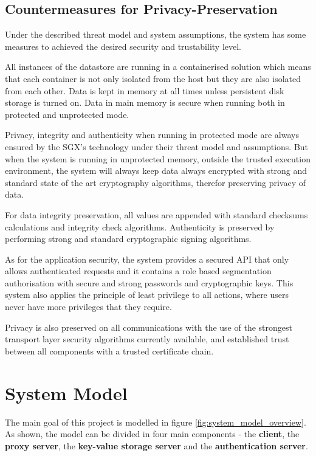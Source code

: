 \subsection{Countermeasures for Privacy-Preservation}
\label{ssec:contermeaseures_for_privacy_preservation}

Under the described threat model and system assumptions, the system has some measures to achieved the desired security and trustability level.

All instances of the datastore are running in a containerised solution which means that each container is not only isolated from the host but they are also isolated from each other. Data is kept in memory at all times unless persistent disk storage is turned on. Data in main memory is secure when running both in protected and unprotected mode. 

Privacy, integrity and authenticity when running in protected mode are always ensured by the \gls{SGX}'s technology under their threat model and assumptions. But when the system is running in unprotected memory, outside the trusted execution environment, the system will always keep data always encrypted with strong and standard state of the art cryptography algorithms, therefor preserving privacy of data. 

For data integrity preservation, all values are appended with standard checksums calculations and integrity check algorithms. Authenticity is preserved by performing strong and standard cryptographic signing algorithms.

As for the application security, the system provides a secured \gls{API} that only allows authenticated requests and it contains a role based segmentation authorisation with secure and strong passwords and cryptographic keys. This system also applies the principle of least privilege \cite{polp:1} to all actions, where users never have more privileges that they require.

Privacy is also preserved on all communications with the use of the strongest transport layer security algorithms currently available, and established trust between all components with a trusted certificate chain.

\section{System Model} %
\label{sec:system_model}

The main goal of this project is modelled in figure \ref{fig:system_model_overview}. As shown, the model can be divided in four main components - the \textbf{client}, the \textbf{proxy server}, the \textbf{key-value storage server} and the \textbf{authentication server}.

